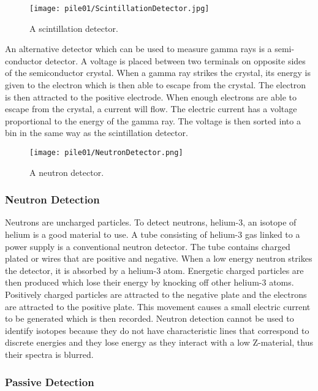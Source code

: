 \documentclass[twoside,titlepage,11pt,twocolumn,a4paper]{article}
\begin{document}
\begin{figure}
  \texttt{[image: pile01/ScintillationDetector.jpg]}
  \caption{A scintillation detector. \citep{nucsafe}}
\end{figure}

An alternative detector which can be used to measure gamma rays is a
semi-conductor detector. A voltage is placed between two terminals on
opposite sides of the semiconductor crystal. \citep{bushberg1994} When
a gamma ray strikes the crystal, its energy is given to the electron
which is then able to escape from the crystal. The electron is then
attracted to the positive electrode. When enough electrons are able to
escape from the crystal, a current will flow. The electric current has
a voltage proportional to the energy of the gamma ray. The voltage is
then sorted into a bin in the same way as the scintillation
detector. \citep{medalia2007,bushberg1994}

\begin{figure}
  \texttt{[image: pile01/NeutronDetector.png]}
  \caption{A neutron detector. \citep{nucsafe}}
\end{figure}

\subsubsection{Neutron Detection}

Neutrons are uncharged particles. To detect neutrons, helium-3, an
isotope of helium is a good material to use. A tube consisting of
helium-3 gas linked to a power supply is a conventional neutron
detector. The tube contains charged plated or wires that are positive
and negative. When a low energy neutron strikes the detector, it is
absorbed by a helium-3 atom.  Energetic charged particles are then
produced which lose their energy by knocking off other helium-3
atoms. Positively charged particles are attracted to the negative
plate and the electrons are attracted to the positive plate. This
movement causes a small electric current to be generated which is then
recorded. Neutron detection cannot be used to identify isotopes
because they do not have characteristic lines that correspond to
discrete energies and they lose energy as they interact with a low
Z-material, thus their spectra is blurred. \citep{medalia2007, bushberg1994}

\subsubsection{Passive Detection}
\end{document}
